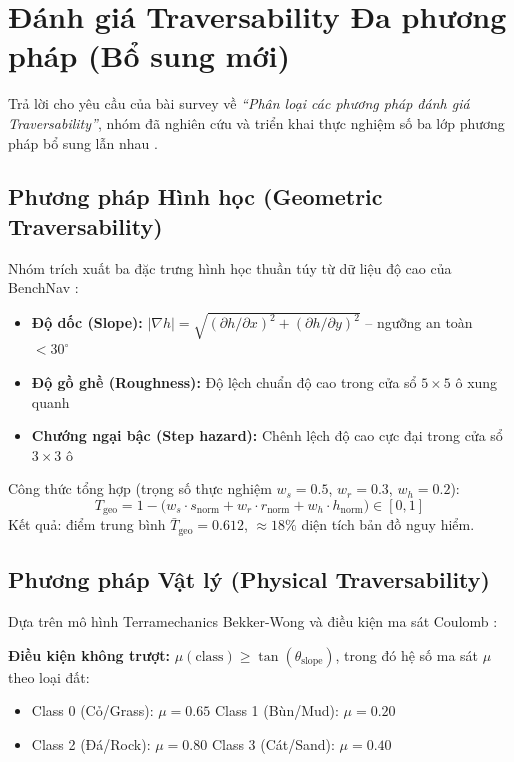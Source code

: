 \documentclass[12pt, a4paper]{article}
\begin{document}
\section{Đánh giá Traversability Đa phương pháp (Bổ sung mới)}

Trả lời cho yêu cầu của bài survey về \textit{``Phân loại các phương pháp đánh giá Traversability''}, nhóm đã nghiên cứu và triển khai thực nghiệm số ba lớp phương pháp bổ sung lẫn nhau \cite{triebel2006}.

\subsection{Phương pháp Hình học (Geometric Traversability)}

Nhóm trích xuất ba đặc trưng hình học thuần túy từ dữ liệu độ cao của BenchNav \cite{endo2024}:

\begin{itemize}
    \item \textbf{Độ dốc (Slope):} $|\nabla h| = \sqrt{(\partial h/\partial x)^2 + (\partial h/\partial y)^2}$ -- ngưỡng an toàn $< 30^\circ$
    \item \textbf{Độ gồ ghề (Roughness):} Độ lệch chuẩn độ cao trong cửa sổ $5 \times 5$ ô xung quanh
    \item \textbf{Chướng ngại bậc (Step hazard):} Chênh lệch độ cao cực đại trong cửa sổ $3 \times 3$ ô
\end{itemize}

Công thức tổng hợp (trọng số thực nghiệm $w_s = 0.5$, $w_r = 0.3$, $w_h = 0.2$):
\begin{equation}
    T_{\text{geo}} = 1 - \bigl(w_s \cdot s_{\text{norm}} + w_r \cdot r_{\text{norm}} + w_h \cdot h_{\text{norm}}\bigr) \in [0, 1]
\end{equation}
Kết quả: điểm trung bình $\bar{T}_{\text{geo}} = 0.612$, $\approx 18\%$ diện tích bản đồ nguy hiểm.

\subsection{Phương pháp Vật lý (Physical Traversability)}

Dựa trên mô hình Terramechanics Bekker-Wong \cite{bekker1956} và điều kiện ma sát Coulomb \cite{higa2019}:

\textbf{Điều kiện không trượt:} $\mu(\text{class}) \geq \tan(\theta_{\text{slope}})$, trong đó hệ số ma sát $\mu$ theo loại đất:
\begin{itemize}
    \item Class 0 (Cỏ/Grass): $\mu = 0.65$ \quad Class 1 (Bùn/Mud): $\mu = 0.20$
    \item Class 2 (Đá/Rock): $\mu = 0.80$ \quad Class 3 (Cát/Sand): $\mu = 0.40$
\end{itemize}
\end{document}
